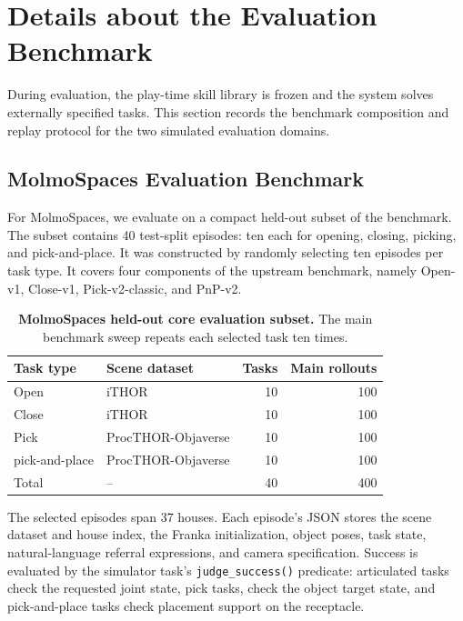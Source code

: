 \section{Details about the Evaluation Benchmark}
\label{sec:appendix_evaluation_benchmarks}

During evaluation, the play-time skill library is frozen and the system solves
externally specified tasks. This section records the benchmark composition and
replay protocol for the two simulated evaluation domains.

\subsection{MolmoSpaces Evaluation Benchmark}
\label{sec:appendix_molmospaces_benchmark}

For MolmoSpaces, we evaluate on a compact held-out subset of the
benchmark. The subset contains
40 test-split episodes: ten each for opening, closing, picking, and
pick-and-place. It was constructed by randomly selecting ten
episodes per task type. It covers four components of the upstream
benchmark, namely Open-v1, Close-v1, Pick-v2-classic, and PnP-v2.

\begin{table}[t]
\centering
\caption{
\textbf{MolmoSpaces held-out core evaluation subset.}
The main benchmark sweep repeats each selected task ten times.
}
\label{tab:molmospaces_eval_benchmark}
\begin{tabular}{llrr}
\toprule
\textbf{Task type} & \textbf{Scene dataset} & \textbf{Tasks} & \textbf{Main rollouts} \\
\midrule
Open & iTHOR & 10 & 100 \\
Close & iTHOR & 10 & 100 \\
Pick & ProcTHOR-Objaverse & 10 & 100 \\
pick-and-place & ProcTHOR-Objaverse & 10 & 100 \\
\midrule
Total & -- & 40 & 400 \\
\bottomrule
\end{tabular}

\end{table}

The selected episodes span 37 houses. Each episode's JSON stores the scene
dataset and house index, the Franka initialization, object poses, task state,
natural-language referral expressions, and camera specification. Success is evaluated by the simulator task's \texttt{judge\_success()} predicate: articulated tasks check the requested
joint state, pick tasks, check the object target state, and pick-and-place tasks
check placement support on the receptacle.

